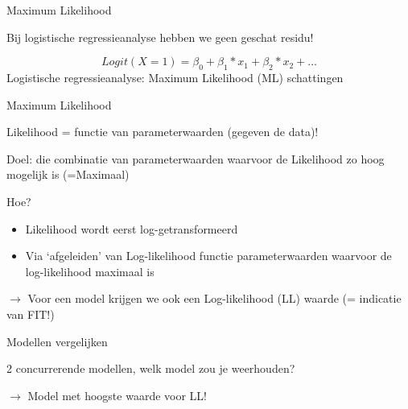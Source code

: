 \documentclass[
  10pt,
  ignorenonframetext,
]{beamer}
\providecommand{\tightlist}{%
  \setlength{\itemsep}{0pt}\setlength{\parskip}{0pt}}
\begin{document}
\begin{frame}{Maximum Likelihood}
\protect\hypertarget{maximum-likelihood}{}

Bij logistische regressieanalyse hebben we geen geschat residu!

\[ Logit(X=1)= \beta_0 + \beta_1 * x_1 + \beta_2 * x_2 + ... \]
\bigskip     Logistische regressieanalyse:
\textcolor{uarood}{Maximum Likelihood} (ML) schattingen

\end{frame}

\begin{frame}{Maximum Likelihood}
\protect\hypertarget{maximum-likelihood-1}{}

\bigskip

Likelihood = functie van parameterwaarden (gegeven de data)!

\bigskip

Doel: die combinatie van parameterwaarden waarvoor de Likelihood zo hoog
mogelijk is (=Maximaal)

\bigskip

Hoe?

\begin{itemize}
\tightlist
\item
  Likelihood wordt eerst log-getransformeerd
\item
  Via `afgeleiden' van Log-likelihood functie parameterwaarden waarvoor
  de log-likelihood maximaal is
\end{itemize}

\bigskip

\(\rightarrow\) Voor een model krijgen we ook een
\textcolor{uarood}{Log-likelihood (LL)} waarde (= indicatie van FIT!)

\end{frame}

\begin{frame}{Modellen vergelijken}
\protect\hypertarget{modellen-vergelijken}{}

\bigskip

2 concurrerende modellen, welk model zou je weerhouden?

\bigskip

\(\rightarrow\) Model met hoogste waarde voor LL!

\end{frame}
\end{document}
